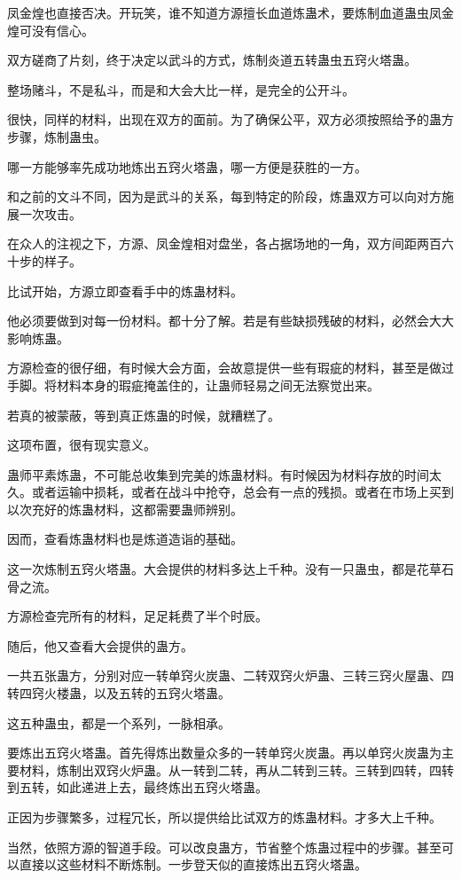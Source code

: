 \begin{this_body}
凤金煌也直接否决。开玩笑，谁不知道方源擅长血道炼蛊术，要炼制血道蛊虫凤金煌可没有信心。

双方磋商了片刻，终于决定以武斗的方式，炼制炎道五转蛊虫五窍火塔蛊。

整场赌斗，不是私斗，而是和大会大比一样，是完全的公开斗。

很快，同样的材料，出现在双方的面前。为了确保公平，双方必须按照给予的蛊方步骤，炼制蛊虫。

哪一方能够率先成功地炼出五窍火塔蛊，哪一方便是获胜的一方。

和之前的文斗不同，因为是武斗的关系，每到特定的阶段，炼蛊双方可以向对方施展一次攻击。

在众人的注视之下，方源、凤金煌相对盘坐，各占据场地的一角，双方间距两百六十步的样子。

比试开始，方源立即查看手中的炼蛊材料。

他必须要做到对每一份材料。都十分了解。若是有些缺损残破的材料，必然会大大影响炼蛊。

方源检查的很仔细，有时候大会方面，会故意提供一些有瑕疵的材料，甚至是做过手脚。将材料本身的瑕疵掩盖住的，让蛊师轻易之间无法察觉出来。

若真的被蒙蔽，等到真正炼蛊的时候，就糟糕了。

这项布置，很有现实意义。

蛊师平素炼蛊，不可能总收集到完美的炼蛊材料。有时候因为材料存放的时间太久。或者运输中损耗，或者在战斗中抢夺，总会有一点的残损。或者在市场上买到以次充好的炼蛊材料，这都需要蛊师辨别。

因而，查看炼蛊材料也是炼道造诣的基础。

这一次炼制五窍火塔蛊。大会提供的材料多达上千种。没有一只蛊虫，都是花草石骨之流。

方源检查完所有的材料，足足耗费了半个时辰。

随后，他又查看大会提供的蛊方。

一共五张蛊方，分别对应一转单窍火炭蛊、二转双窍火炉蛊、三转三窍火屋蛊、四转四窍火楼蛊，以及五转的五窍火塔蛊。

这五种蛊虫，都是一个系列，一脉相承。

要炼出五窍火塔蛊。首先得炼出数量众多的一转单窍火炭蛊。再以单窍火炭蛊为主要材料，炼制出双窍火炉蛊。从一转到二转，再从二转到三转。三转到四转，四转到五转，如此递进上去，最终炼出五窍火塔蛊。

正因为步骤繁多，过程冗长，所以提供给比试双方的炼蛊材料。才多大上千种。

当然，依照方源的智道手段。可以改良蛊方，节省整个炼蛊过程中的步骤。甚至可以直接以这些材料不断炼制。一步登天似的直接炼出五窍火塔蛊。


\end{this_body}
